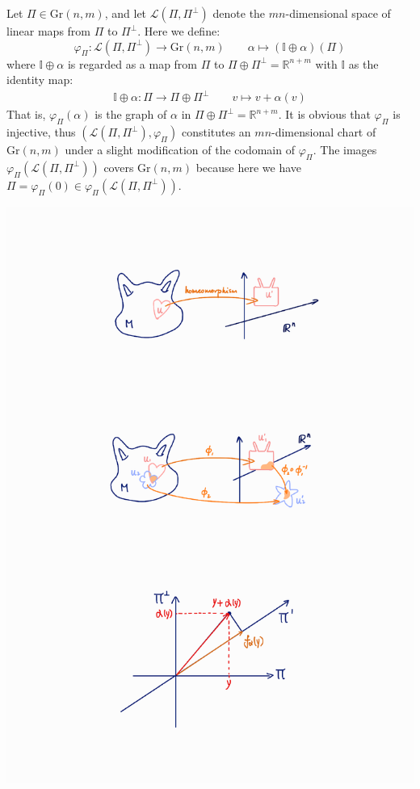 \documentclass[11pt]{book}
\theoremstyle{break}
\theoremstyle{break}
\newcommand{\R}{\mathbb{R}}
\begin{document}
Let $\Pi \in \text{Gr}(n,m)$, and let $\mathcal{L}(\Pi, \Pi^\perp)$ denote the $mn$-dimensional space of linear maps from $\Pi$ to $\Pi^{\perp}$. Here we define: 
$$\varphi_{\Pi}:\mathcal{L}(\Pi, \Pi^{\perp}) \to \text{Gr}(n,m) \qquad \alpha\mapsto\left( \mathbb{I}\oplus \alpha\right) (\Pi)
$$
where $\mathbb{I}\oplus \alpha$ is regarded as a map from $\Pi$ to $\Pi\oplus \Pi^{\perp} = \R^{n+m}$ with $\mathbb{I}$ as the identity map:
\begin{align*}
\mathbb{I}\oplus \alpha : \Pi \to \Pi \oplus \Pi^{\perp} \qquad v\mapsto v+\alpha(v)
\end{align*}
That is, $\varphi_{\Pi}(\alpha)$ is the graph of $\alpha$ in $\Pi \oplus \Pi^{\perp} = \R^{n+m}$. It is obvious that $\varphi_{\Pi}$ is injective, thus $(\mathcal{L}(\Pi, \Pi^{\perp}), \varphi_{\Pi})$ constitutes an $mn$-dimensional chart of $\text{Gr}(n,m)$ under a slight modification of the codomain of $\varphi_{\Pi}$. The images $\varphi_{\Pi}(\mathcal{L}(\Pi, \Pi^{\perp}))$ covers $\text{Gr}(n,m)$ because here we have $\Pi = \varphi_{\Pi}(0) \in \varphi_{\Pi}(\mathcal{L}(\Pi, \Pi^{\perp}))$. \\
\begin{center}
\includegraphics[scale=0.69]{GR}
\end{center}
\end{document}
